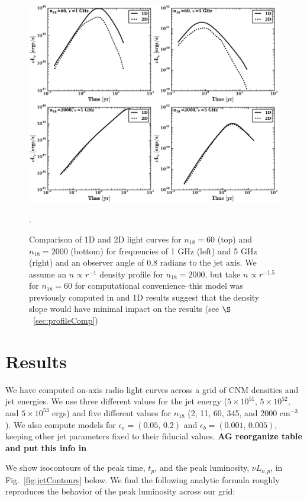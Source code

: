 \documentclass[usenatbib,fleqn]{mnras}
\begin{document}
\begin{figure}
\includegraphics[width=16cm]{1D_2D.pdf}
\caption{\label{fig:1D2DB} Comparison of 1D and 2D light curves for
  $n_{18}=60$ (top) and $n_{18}=2000$ (bottom) for frequencies of 1
  GHz (left) and 5 GHz (right) and an observer angle of 0.8 radians
  to the jet axis. We assume an $n\propto r^{-1}$ density profile for
  $n_{18}=2000$, but take $n\propto r^{-1.5}$ for $n_{18}=60$ for
  computational convenience--this model was previously computed in
  \citet{Mimica+2015} and 1D results suggest that the density slope would
  have minimal impact on the results (see $\S$~\ref{sec:profileComp})}.
\end{figure}

\section{Results}
\label{sec:results}
We have computed on-axis radio light curves across a grid of CNM
densities and jet energies. We use three different values for the
jet energy ($5 \times 10^{51}$, $5 \times 10^{52}$, and $5 \times
10^{53}$ ergs) and five different values for $n_{18}$ (2, 11, 60, 345,
and 2000 cm$^{-3}$). We also compute models for $\epsilon_e=(0.05,\, 0.2)$
and $\epsilon_b=(0.001,\, 0.005)$, keeping other jet parameters fixed to
their fiducial values. {\bf AG reorganize table and put this info in}

We show isocontours of the peak time, $t_p$, and the peak luminosity,
$\nu L_{\nu, p}$, in Fig.~\ref{fig:jetContours} below. We find the
following analytic formula roughly reproduces the behavior of the peak
luminosity across our grid:
\end{document}
